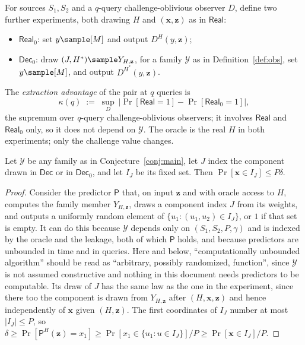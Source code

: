 \documentclass{conjura-conjecture}
\newcommand{\Real}{\mathsf{Real}}
\newcommand{\Dec}{\mathsf{Dec}}
\newcommand{\Prob}[1]{\Pr\!\left[#1\right]}
\newcommand{\vx}{\mathbf{x}}
\newcommand{\vz}{\mathbf{z}}
\begin{document}
\begin{definition}\label{def:kappa}
For sources $S_1,S_2$ and a $q$-query challenge-oblivious observer $D$,
define two further experiments, both drawing $H$ and $(\vx,\vz)$ as in
$\Real$:
\begin{itemize}
\item $\Real_0$: set $y \sample [M]$ and output $D^{H}(y,\vz)$;
\item $\Dec_0$: draw $(J,H^{*}) \sample Y_{H,\vz}$, for a family
  $\mathcal{Y}$ as in Definition~\ref{def:obs}, set $y \sample [M]$, and
  output $D^{H^{*}}(y,\vz)$.
\end{itemize}
The \emph{extraction advantage} of the pair at $q$ queries is
\[
  \kappa(q) \;:=\; \sup_{D}\ \bigl|\Prob{\Real = 1} - \Prob{\Real_0 = 1}\bigr| ,
\]
the supremum over $q$-query challenge-oblivious observers; it involves
$\Real$ and $\Real_0$ only, so it does not depend on $\mathcal{Y}$. The oracle is the
real $H$ in both experiments; only the challenge value changes.
\end{definition}

\begin{lemma}\label{lem:hit}
Let $\mathcal{Y}$ be any family as in Conjecture~\ref{conj:main}, let $J$
index the component drawn in $\Dec$ or in $\Dec_0$, and let $I_J$ be its
fixed set. Then $\Prob{\vx \in I_J} \le P\delta$.
\end{lemma}

\begin{proof}
Consider the predictor $\mathsf{P}$ that, on input $\vz$ and with oracle
access to $H$, computes the family member $Y_{H,\vz}$, draws a component
index $J$ from its weights, and outputs a uniformly random element of
$\{u_1 : (u_1,u_2) \in I_J\}$, or $1$ if that set is empty. It can do this
because $\mathcal{Y}$ depends only on $(S_1,S_2,P,\gamma)$ and is indexed by
the oracle and the leakage, both of which $\mathsf{P}$ holds, and because
predictors are unbounded in time and in queries. Here and below,
``computationally unbounded algorithm'' should be read as ``arbitrary,
possibly randomized, function'', since $\mathcal{Y}$ is not assumed
constructive and nothing in this document needs predictors to be
computable. Its draw
of $J$ has the same law as the one in the experiment, since there too the
component is drawn from $Y_{H,\vz}$ after $(H,\vx,\vz)$ and hence
independently of $\vx$ given $(H,\vz)$. The first coordinates of $I_J$
number at most $|I_J| \le P$, so
$\delta \ge \Prob{\mathsf{P}^{H}(\vz) = x_1} \ge \Prob{x_1 \in
\{u_1 : u \in I_J\}}/P \ge \Prob{\vx \in I_J}/P$.
\end{proof}
\end{document}
